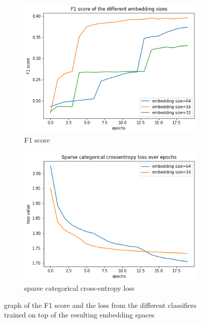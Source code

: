 \begin{figure}[tb]
\centering
\begin{subfigure}{.5\linewidth}
  \centering
  \includegraphics[width=.9\linewidth]{study-doc/experiment_embedding_size/assets/classifier_f1.png}
  \caption{F1 score}
  \label{fig:regularisation-experiment-classifier-f1}
\end{subfigure}%
\begin{subfigure}{.5\linewidth}
  \centering
  \includegraphics[width=.9\linewidth]{study-doc/experiment_embedding_size/assets/classifier_loss.png}
  \caption{sparse categorical cross-entropy loss}
  \label{fig:regularisation-experiment-classifier-loss}
\end{subfigure}
\caption{graph of the F1 score and the loss from the different classifiers trained on top of the resulting embedding spaces}
\label{fig:regularisation-experiment-classifier-metrics}
\end{figure}
